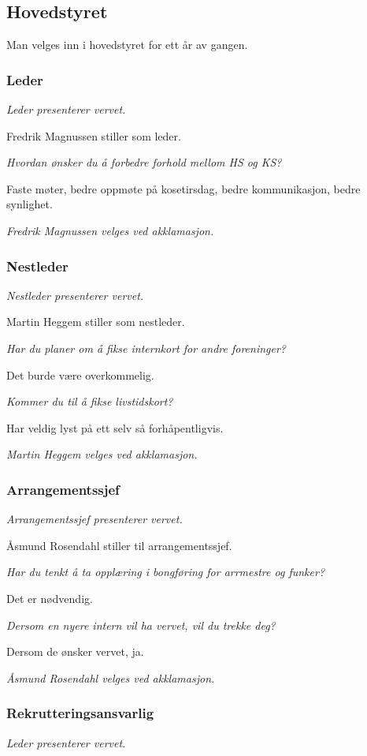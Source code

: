 \documentclass[10pt,norsk,a4paper]{article}
\begin{document}
\begin{minipage}[t]{0.49\textwidth}
\subsection{Hovedstyret}
Man velges inn i hovedstyret for ett år av gangen.

\subsubsection{Leder}
\textit{Leder presenterer vervet.}

Fredrik Magnussen stiller som leder. 

\emph{Hvordan ønsker du å forbedre forhold mellom HS og KS?}

Faste møter, bedre oppmøte på kosetirsdag, bedre kommunikasjon, bedre synlighet.

\textit{Fredrik Magnussen velges ved akklamasjon.}
\subsubsection{Nestleder}
\textit{Nestleder presenterer vervet.}

Martin Heggem stiller som nestleder.

\emph{Har du planer om å fikse internkort for andre foreninger?}

Det burde være overkommelig. 

\emph{Kommer du til å fikse livstidskort?}

Har veldig lyst på ett selv så forhåpentligvis.

\textit{Martin Heggem velges ved akklamasjon.}
\subsubsection{Arrangementssjef}
\textit{Arrangementssjef presenterer vervet.}

Åsmund Rosendahl stiller til arrangementssjef. 

\emph{Har du tenkt å ta opplæring i bongføring for arrmestre og funker?}

Det er nødvendig. 

\emph{Dersom en nyere intern vil ha vervet, vil du trekke deg?}

Dersom de ønsker vervet, ja. 

\textit{Åsmund Rosendahl velges ved akklamasjon.}
\subsubsection{Rekrutteringsansvarlig}
\textit{Leder presenterer vervet.}


\end{minipage}
\end{document}
